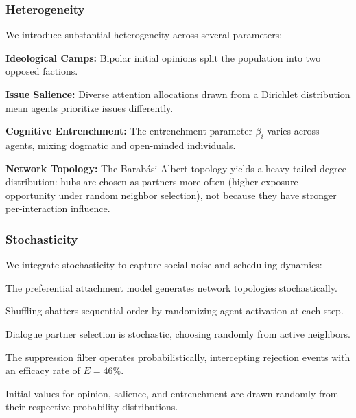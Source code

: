 \subsubsection{Heterogeneity}
We introduce substantial heterogeneity across several parameters:
\begin{itemize*}
    \item \textbf{Ideological Camps:} Bipolar initial opinions split the population into two opposed factions.
    \item \textbf{Issue Salience:} Diverse attention allocations drawn from a Dirichlet distribution mean agents prioritize issues differently.
    \item \textbf{Cognitive Entrenchment:} The entrenchment parameter $\beta_i$ varies across agents, mixing dogmatic and open-minded individuals.
    \item \textbf{Network Topology:} The Barab\'{a}si-Albert topology yields a heavy-tailed degree distribution: hubs are chosen as partners more often (higher exposure opportunity under random neighbor selection), not because they have stronger per-interaction influence.
\end{itemize*}

\subsubsection{Stochasticity}
We integrate stochasticity to capture social noise and scheduling dynamics:
\begin{itemize*}
    \item The preferential attachment model generates network topologies stochastically.
    \item Shuffling shatters sequential order by randomizing agent activation at each step.
    \item Dialogue partner selection is stochastic, choosing randomly from active neighbors.
    \item The suppression filter operates probabilistically, intercepting rejection events with an efficacy rate of $E = 46\%$.
    \item Initial values for opinion, salience, and entrenchment are drawn randomly from their respective probability distributions.
\end{itemize*}

